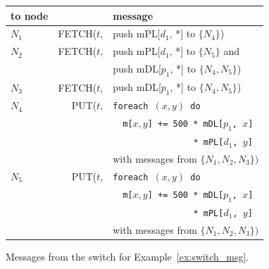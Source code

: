 \begin{figure}
\begin{center}
\begin{tabular}{l|r@{~}l}
to node & & message \\
\hline
$N_1$ & FETCH($t$, & push mPL[$d_1$, *] to $\{N_4\}$) \\[.7ex]
$N_2$ & FETCH($t$, & push mPL[$d_1$, *] to $\{N_5\}$ and \\
      &            & push mDL[$p_1$, *] to $\{N_4, N_5\}$) \\[.7ex]
$N_3$ & FETCH($t$, & push mDL[$p_1$, *] to $\{N_4, N_5\}$) \\[.7ex]
$N_4$ & PUT($t$,   & {\tt foreach $(x,y)$ do} \\
      &            & ~~{\tt m[$x,y$] += 500 * mDL[$p_1$, $x$]} \\
      &            & ~~{\tt ~~~~~~~~~~~~~ * mPL[$d_1$, $y$]} \\
      &            & with messages from $\{N_1, N_2, N_3\})$ \\[.7ex]
$N_5$ & PUT($t$,   & {\tt foreach $(x,y)$ do} \\
      &            & ~~{\tt m[$x,y$] += 500 * mDL[$p_1$, $x$]} \\
      &            & ~~{\tt ~~~~~~~~~~~~~ * mPL[$d_1$, $y$]} \\
      &            & with messages from $\{N_1, N_2, N_3\})$
\end{tabular}
\end{center}

\vspace{-4mm}

\caption{Messages from the switch for Example~\ref{ex:switch_msg}.}
\label{fig:switch_msg}
\end{figure}



